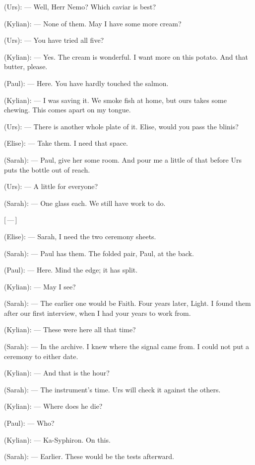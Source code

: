 
\begin{room}

(Urs): --- Well, Herr Nemo? Which caviar is best?

(Kylian): --- None of them. May I have some more cream?

(Urs): --- You have tried all five?

(Kylian): --- Yes. The cream is wonderful. I want more on this potato. And that butter, please.

(Paul): --- Here. You have hardly touched the salmon.

(Kylian): --- I was saving it. We smoke fish at home, but ours takes some chewing. This comes apart on my tongue.

(Urs): --- There is another whole plate of it. Elise, would you pass the blinis?

(Elise): --- Take them. I need that space.

(Sarah): --- Paul, give her some room. And pour me a little of that before Urs puts the bottle out of reach.

(Urs): --- A little for everyone?

(Sarah): --- One glass each. We still have work to do.

\centerline{[\,---\,]}

(Elise): --- Sarah, I need the two ceremony sheets.

(Sarah): --- Paul has them. The folded pair, Paul, at the back.

(Paul): --- Here. Mind the edge; it has split.

(Kylian): --- May I see?

(Sarah): --- The earlier one would be Faith. Four years later, Light. I found them after our first interview, when I had your years to work from.

(Kylian): --- These were here all that time?

(Sarah): --- In the archive. I knew where the signal came from. I could not put a ceremony to either date.

(Kylian): --- And that is the hour?

(Sarah): --- The instrument's time. Urs will check it against the others.

(Kylian): --- Where does he die?

(Paul): --- Who?

(Kylian): --- Ka-Syphiron. On this.

(Sarah): --- Earlier. These would be the tests afterward.


\end{room}

